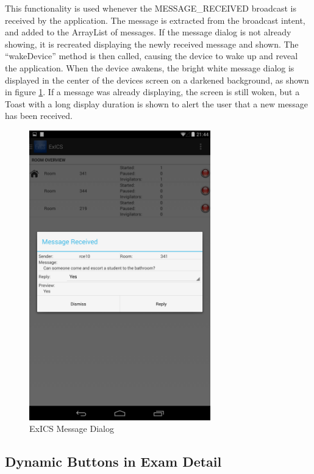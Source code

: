 This functionality is used whenever the MESSAGE\_RECEIVED broadcast is received by the application.  The message is extracted from the broadcast intent, and added to the ArrayList of messages. If the message dialog is not already showing, it is recreated displaying the newly received message and shown.  The ``wakeDevice'' method is then called, causing the device to wake up and reveal the application.  When the device awakens, the bright white message dialog is displayed in the center of the devices screen on a darkened background, as shown in figure \ref{fig:message_screen}.  If a message was already displaying, the screen is still woken, but a Toast\cite{androidToasts} with a long display duration is shown to alert the user that a new message has been received.

\FloatBarrier

\begin{figure}[!htpb]
	\centering
	\includegraphics[width=0.7\textwidth]{"screenshots/tablet_portrait_message_roomlist"}
	\caption{ExICS Message Dialog}
	\label{fig:message_screen}
\end{figure}

\FloatBarrier

\subsection{Dynamic Buttons in Exam Detail}
\label{subs:exam_detail_buttons}

